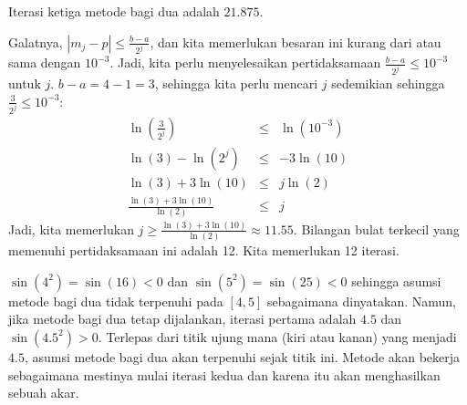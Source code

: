 \begin{description}
Iterasi ketiga metode bagi dua adalah $21.875$.
\item [{\ref{exc:bisection-1}:}] Galatnya, $|m_{j}-p|\leq\frac{b-a}{2^{j}}$,
dan kita memerlukan besaran ini kurang dari atau sama dengan $10^{-3}$.
Jadi, kita perlu menyelesaikan pertidaksamaan $\frac{b-a}{2^{j}}\leq10^{-3}$
untuk $j$. $b-a=4-1=3$, sehingga kita perlu mencari $j$ sedemikian
sehingga $\frac{3}{2^{j}}\leq10^{-3}$:
\begin{eqnarray*}
\ln\left(\frac{3}{2^{j}}\right) & \leq & \ln(10^{-3})\\
\ln(3)-\ln(2^{j}) & \leq & -3\ln(10)\\
\ln(3)+3\ln(10) & \leq & j\ln(2)\\
\frac{\ln(3)+3\ln(10)}{\ln(2)} & \leq & j
\end{eqnarray*}
Jadi, kita memerlukan $j\geq\frac{\ln(3)+3\ln(10)}{\ln(2)}\approx11.55$.
Bilangan bulat terkecil yang memenuhi pertidaksamaan ini adalah 12.
Kita memerlukan 12 iterasi.
\item [{\ref{exc:bisection-4}:}] $\sin(4^{2})=\sin(16)<0$ dan $\sin(5^{2})=\sin(25)<0$
sehingga asumsi metode bagi dua tidak terpenuhi pada $[4,5]$ sebagaimana
dinyatakan. Namun, jika metode bagi dua tetap dijalankan, iterasi
pertama adalah $4.5$ dan $\sin(4.5^{2})>0$. Terlepas dari titik
ujung mana (kiri atau kanan) yang menjadi $4.5$, asumsi metode bagi
dua akan terpenuhi sejak titik ini. Metode akan bekerja sebagaimana
mestinya mulai iterasi kedua dan karena itu akan menghasilkan sebuah
akar.
\end{description}


